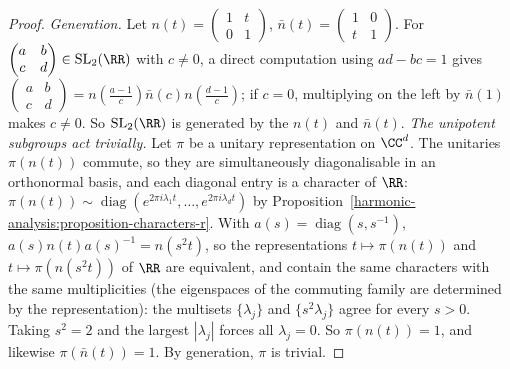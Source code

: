 \begin{proof}
\emph{Generation.} Let $n(t) = \begin{pmatrix} 1 & t \\ 0 & 1 \end{pmatrix}$, $\bar n(t) = \begin{pmatrix} 1 & 0 \\ t & 1 \end{pmatrix}$. For $\begin{pmatrix} a & b \\ c & d \end{pmatrix} \in \mathrm{SL}_2(\RR)$ with $c \neq 0$, a direct
computation using $ad - bc = 1$ gives $\begin{pmatrix} a & b \\ c & d \end{pmatrix} = n(\frac{a - 1}{c})\bar n(c)n(\frac{d - 1}{c})$; if $c = 0$, multiplying on the left by $\bar n(1)$ makes $c \neq 0$. So $\mathrm{SL}_2(\RR)$ is
generated by the $n(t)$ and $\bar n(t)$.
\emph{The unipotent subgroups act trivially.} Let $\pi$ be a unitary representation on $\CC^d$. The unitaries $\pi(n(t))$ commute, so they are simultaneously diagonalisable in an orthonormal basis, and each diagonal entry
is a character of $\RR$: $\pi(n(t)) \sim \operatorname{diag}(e^{2\pi i\lambda_1t}, \ldots, e^{2\pi i\lambda_dt})$ by Proposition~\ref{harmonic-analysis:proposition-characters-r}. With $a(s) = \operatorname{diag}(s, s^{-1})$,
$a(s)n(t)a(s)^{-1} = n(s^2t)$, so the representations $t \mapsto \pi(n(t))$ and $t \mapsto \pi(n(s^2t))$ of $\RR$ are equivalent, and contain the same characters with the same multiplicities (the eigenspaces of the commuting family are
determined by the representation): the multisets $\{\lambda_j\}$ and $\{s^2\lambda_j\}$ agree for every $s > 0$. Taking $s^2 = 2$ and the largest $|\lambda_j|$ forces all $\lambda_j = 0$. So $\pi(n(t)) = 1$, and likewise $\pi(\bar n(t)) = 1$. By generation, $\pi$ is trivial.
\end{proof}

